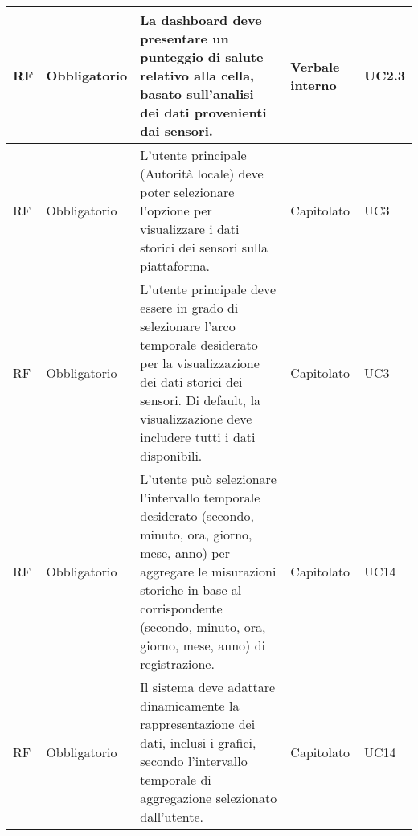\begin{longtable}{|C{1cm}|C{2cm}|>{\raggedright}m{5cm}|C{2cm}|C{1.5cm}|}
    \hline
     RF & Obbligatorio        & La dashboard deve presentare un punteggio di salute relativo alla cella, basato sull'analisi dei dati provenienti dai sensori.                                                                                                     & Verbale interno      & UC2.3               \\
    \hline
     RF & Obbligatorio        & L'utente principale (Autorità locale) deve poter selezionare l'opzione per visualizzare i dati storici dei sensori sulla piattaforma.                                                                                              & Capitolato      & UC3               \\
    \hline
     RF & Obbligatorio        & L'utente principale deve essere in grado di selezionare l'arco temporale desiderato per la visualizzazione dei dati storici dei sensori. Di default, la visualizzazione deve includere tutti i dati disponibili.                   & Capitolato      & UC3               \\
    \hline
     RF & Obbligatorio        & L'utente può selezionare l'intervallo temporale desiderato (secondo, minuto, ora, giorno, mese, anno) per aggregare le misurazioni storiche in base al corrispondente (secondo, minuto, ora, giorno, mese, anno) di registrazione. & Capitolato      & UC14               \\
    \hline
     RF & Obbligatorio        &     Il sistema deve adattare dinamicamente la rappresentazione dei dati, inclusi i grafici, secondo l'intervallo temporale di aggregazione selezionato dall'utente. & Capitolato      & UC14               \\
    \hline


\end{longtable}
